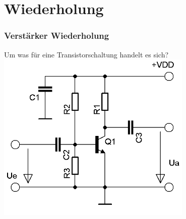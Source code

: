 

\subtitle{Technik A07: \\
Oszillator und Hochfrequenzverstärker \\[2em]}
\date{Stand 01.06.2016}


\section*{Wiederholung}

\begin{frame}
  \frametitle{Verstärker Wiederholung}
  \begin{center}
    \large Um was für eine Transistorschaltung handelt es sich?
    \includegraphics[width=0.7\textwidth,height=.8\textheight,keepaspectratio]{a07/Transistor_Verstaerker_emetter.png}
  \end{center}
\end{frame}

